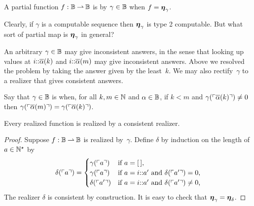 \begin{definition}
  \label{def:type-2-realized}%
  A partial function $f : \mathbb{B} \mathbin{\rightharpoonup} \mathbb{B}$ is  by $\gamma \in \mathbb{B}$ when $f = \text{\boldmath{$\eta$}}_\gamma$.
\end{definition}

Clearly, if $\gamma$ is a computable sequence then $\text{\boldmath{$\eta$}}_\gamma$ is type 2 computable.
But what sort of partial map is $\text{\boldmath{$\eta$}}_\gamma$ in general?

An arbitrary $\gamma \in \mathbb{B}$ may give inconsistent answers, in the sense that looking up values at $i {:}{:} \overline{\alpha}(k)$ and $i {:}{:} \overline{\alpha}(m)$ may give inconsistent answers. Above we resolved the problem by taking the answer given by the least~$k$. We may also rectify~$\gamma$ to a realizer that gives consistent answers.

Say that $\gamma \in \mathbb{B}$ is  when, for all $k, m \in \mathbb{N}$ and
$\alpha \in \mathbb{B}$, if $k < m$ and $\gamma(\ulcorner \overline{\alpha}(k) \urcorner) \neq 0$ then
$\gamma(\ulcorner \overline{\alpha}(m) \urcorner) = \gamma(\ulcorner \overline{\alpha}(k) \urcorner)$.

\begin{lemma}
  \label{lemma:normalized-BB}%
  Every realized function is realized by a consistent realizer.
\end{lemma}

\begin{proof}
  Suppose $f : \mathbb{B} \mathbin{\rightharpoonup} \mathbb{B}$ is realized by~$\gamma$. Define
  $\delta$ by induction on the length of $a \in \mathbb{N}^{\star}$ by
  \begin{equation*}
    \delta(\ulcorner a \urcorner) =
    \begin{cases}
      \gamma(\ulcorner a \urcorner) & \text{if $a = [\,]$,}\\
      \gamma(\ulcorner a \urcorner) & \text{if $a = i {:}{:} a'$ and
        $\delta(\ulcorner a' \urcorner) = 0$,}\\
      \delta(\ulcorner a' \urcorner) & \text{if $a = i {:}{:} a'$ and
        $\delta(\ulcorner a' \urcorner) \neq 0$,}
    \end{cases}
  \end{equation*}
  The realizer $\delta$ is consistent by construction. It is easy to check that $\text{\boldmath{$\eta$}}_\gamma = \text{\boldmath{$\eta$}}_\delta$.
\end{proof}


